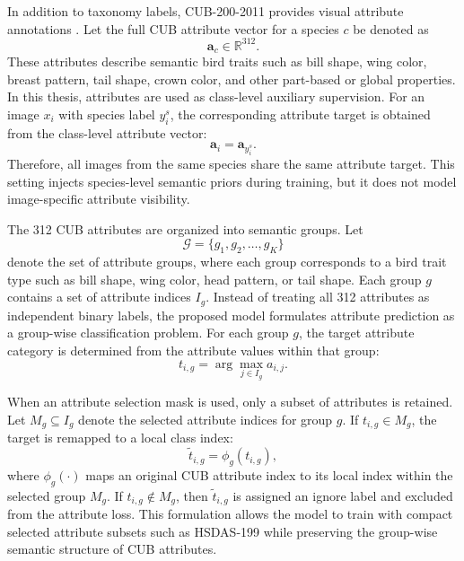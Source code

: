 In addition to taxonomy labels, CUB-200-2011 provides visual attribute annotations \cite{wah2011cub}. Let the full CUB attribute vector for a species \(c\) be denoted as
\begin{equation}
    \mathbf{a}_{c} \in \mathbb{R}^{312}.
\end{equation}
These attributes describe semantic bird traits such as bill shape, wing color, breast pattern, tail shape, crown color, and other part-based or global properties. In this thesis, attributes are used as class-level auxiliary supervision. For an image \(x_i\) with species label \(y_i^{s}\), the corresponding attribute target is obtained from the class-level attribute vector:
\begin{equation}
    \mathbf{a}_i = \mathbf{a}_{y_i^{s}}.
\end{equation}
Therefore, all images from the same species share the same attribute target. This setting injects species-level semantic priors during training, but it does not model image-specific attribute visibility.

The 312 CUB attributes are organized into semantic groups. Let
\begin{equation}
    \mathcal{G} = \{g_1, g_2, \ldots, g_K\}
\end{equation}
denote the set of attribute groups, where each group corresponds to a bird trait type such as bill shape, wing color, head pattern, or tail shape. Each group \(g\) contains a set of attribute indices \(I_g\). Instead of treating all 312 attributes as independent binary labels, the proposed model formulates attribute prediction as a group-wise classification problem. For each group \(g\), the target attribute category is determined from the attribute values within that group:
\begin{equation}
    t_{i,g}
    =
    \arg\max_{j \in I_g} a_{i,j}.
\end{equation}

When an attribute selection mask is used, only a subset of attributes is retained. Let \(M_g \subseteq I_g\) denote the selected attribute indices for group \(g\). If \(t_{i,g} \in M_g\), the target is remapped to a local class index:
\begin{equation}
    \tilde{t}_{i,g} = \phi_g(t_{i,g}),
\end{equation}
where \(\phi_g(\cdot)\) maps an original CUB attribute index to its local index within the selected group \(M_g\). If \(t_{i,g} \notin M_g\), then \(\tilde{t}_{i,g}\) is assigned an ignore label and excluded from the attribute loss. This formulation allows the model to train with compact selected attribute subsets such as HSDAS-199 while preserving the group-wise semantic structure of CUB attributes.

